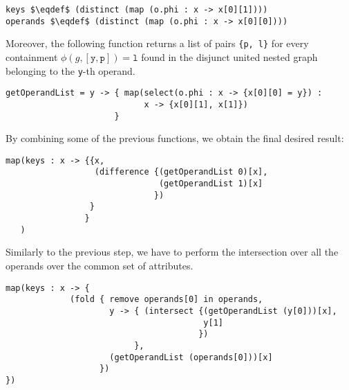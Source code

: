 \begin{lstlisting}[language=script,mathescape=true]
keys $\eqdef$ (distinct (map (o.phi : x -> x[0][1])))
operands $\eqdef$ (distinct (map (o.phi : x -> x[0][0])))
\end{lstlisting}

Moreover, the following function returns a list of pairs \texttt{\{p, l\}} for every containment $\phi(g,[\texttt{y},\texttt{p}])=\texttt{l}$ found in the disjunct united nested graph belonging to the \texttt{y}-th operand.

\begin{lstlisting}[language=script]
getOperandList = y -> { map(select(o.phi : x -> {x[0][0] = y}) : 
                            x -> {x[0][1], x[1]}) 
                      }
\end{lstlisting}

By combining some of the previous functions, we obtain the final desired result:

\begin{lstlisting}[language=script,]
map(keys : x -> {{x, 
                  (difference {(getOperandList 0)[x], 
                               (getOperandList 1)[x]
                              })
                 }
                }
   )
\end{lstlisting}


Similarly to the previous step, we have to perform the intersection over all the operands over the common set of attributes.

\begin{lstlisting}[language=script]
map(keys : x -> {
             (fold { remove operands[0] in operands, 
                     y -> { (intersect {(getOperandList (y[0]))[x], 
                                        y[1]
                                       })
                          },
                     (getOperandList (operands[0]))[x]   
                   })
})
\end{lstlisting}

